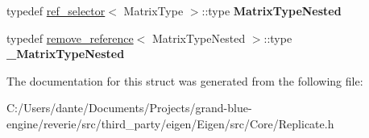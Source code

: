 \begin{DoxyCompactItemize}
typedef \mbox{\hyperlink{struct_eigen_1_1internal_1_1ref__selector}{ref\+\_\+selector}}$<$ Matrix\+Type $>$\+::type {\bfseries Matrix\+Type\+Nested}
\item 
\mbox{\label{struct_eigen_1_1internal_1_1traits_3_01_replicate_3_01_matrix_type_00_01_row_factor_00_01_col_factor_01_4_01_4_a3c6f5df06bf46df6cbf5250ba5a22453}} 
typedef \mbox{\hyperlink{struct_eigen_1_1internal_1_1remove__reference}{remove\+\_\+reference}}$<$ Matrix\+Type\+Nested $>$\+::type {\bfseries \+\_\+\+Matrix\+Type\+Nested}
\end{DoxyCompactItemize}


The documentation for this struct was generated from the following file\+:\begin{DoxyCompactItemize}
\item 
C\+:/\+Users/dante/\+Documents/\+Projects/grand-\/blue-\/engine/reverie/src/third\+\_\+party/eigen/\+Eigen/src/\+Core/Replicate.\+h\end{DoxyCompactItemize}
